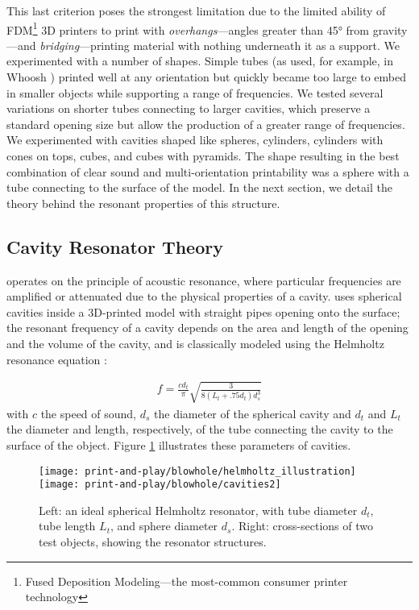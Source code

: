     This last criterion poses the strongest limitation due to the limited
    ability of FDM\footnote{Fused Deposition Modeling---the most-common consumer
    printer technology} 3D printers to print with \textit{overhangs}---angles
    greater than 45° from gravity---and \textit{bridging}---printing
    material with nothing underneath it as a support. We experimented with a
    number of shapes. Simple tubes (as used, for example, in Whoosh
    \cite{Reyes:2016iy}) printed well at any orientation but quickly became too
    large to embed in smaller objects while supporting a range of frequencies.
    We tested several variations on shorter tubes connecting to larger cavities,
    which preserve a standard opening size but allow the production of a greater
    range of frequencies. We experimented with cavities shaped like spheres,
    cylinders, cylinders with cones on tops, cubes, and cubes with pyramids. The
    shape resulting in the best combination of clear sound and multi-orientation
    printability was a sphere with a tube connecting to the surface of the
    model. In the next section, we detail the theory behind the resonant
    properties of this structure.

    \subsection{Cavity Resonator Theory}
      \bh operates on the principle of acoustic resonance, where particular
      frequencies are amplified or attenuated due to the physical properties of
      a cavity. \bh uses spherical cavities inside a 3D-printed model with
      straight pipes opening onto the surface; the resonant frequency of a
      cavity depends on the area and length of the opening and the volume of the
      cavity, and is classically modeled using the Helmholtz resonance equation
      \cite{Helmholtz:1885vp}:

      \begin{align}\label{eq:hhz}
        f = \frac{cd_t}{\pi}\sqrt{\frac{3}{8(L_t+.75 d_t)d_s^3}}
      \end{align}
      with $c$ the speed of sound, $d_s$ the diameter of the spherical cavity
      and $d_t$ and $L_t$ the diameter and length, respectively, of the tube
      connecting the cavity to the surface of the object. Figure \ref{fig:resonator}
      illustrates these parameters of \bh cavities.
      
      \begin{figure}
        \centering
        \texttt{[image: print-and-play/blowhole/helmholtz\_illustration]}
        \quad
        \texttt{[image: print-and-play/blowhole/cavities2]}
        \caption{Left: an ideal spherical Helmholtz resonator, with tube
          diameter $d_t$, tube length $L_t$, and sphere diameter $d_s$. Right:
          cross-sections of two \bh test objects, showing the resonator
          structures.}
        \label{fig:resonator}
      \end{figure}         

